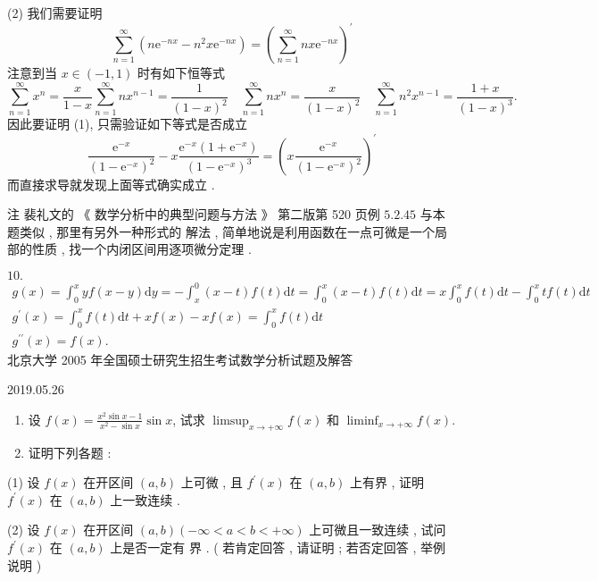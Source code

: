 \documentclass[10pt]{article}
\begin{document}
(2)  我们需要证明 
$$
\sum_{n=1}^{\infty}\left(n \mathrm{e}^{-n x}-n^{2} x \mathrm{e}^{-n x}\right)=\left(\sum_{n=1}^{\infty} n x \mathrm{e}^{-n x}\right)^{\prime}
$$
 注意到当  $x \in(-1,1)$  时有如下恒等式 
$$
\sum_{n=1}^{\infty} x^{n}=\frac{x}{1-x} \sum_{n=1}^{\infty} n x^{n-1}=\frac{1}{(1-x)^{2}} \quad \sum_{n=1}^{\infty} n x^{n}=\frac{x}{(1-x)^{2}} \quad \sum_{n=1}^{\infty} n^{2} x^{n-1}=\frac{1+x}{(1-x)^{3}} .
$$
 因此要证明  (1),  只需验证如下等式是否成立 
$$
\frac{\mathrm{e}^{-x}}{\left(1-\mathrm{e}^{-x}\right)^{2}}-x \frac{\mathrm{e}^{-x}\left(1+\mathrm{e}^{-x}\right)}{\left(1-\mathrm{e}^{-x}\right)^{3}}=\left(x \frac{\mathrm{e}^{-x}}{\left(1-\mathrm{e}^{-x}\right)^{2}}\right)^{\prime}
$$
 而直接求导就发现上面等式确实成立 .

 注   裴礼文的 《 数学分析中的典型问题与方法 》 第二版第  520  页例  $5.2 .45$  与本题类似 ,  那里有另外一种形式的   解法 ,  简单地说是利用函数在一点可微是一个局部的性质 ,  找一个内闭区间用逐项微分定理 .

$10 .$
$$
\begin{gathered}
g(x)=\int_{0}^{x} y f(x-y) \mathrm{d} y=-\int_{x}^{0}(x-t) f(t) \mathrm{d} t=\int_{0}^{x}(x-t) f(t) \mathrm{d} t=x \int_{0}^{x} f(t) \mathrm{d} t-\int_{0}^{x} t f(t) \mathrm{d} t \\
g^{\prime}(x)=\int_{0}^{x} f(t) \mathrm{d} t+x f(x)-x f(x)=\int_{0}^{x} f(t) \mathrm{d} t \\
g^{\prime \prime}(x)=f(x) .
\end{gathered}
$$
 北京大学  2005  年全国硕士研究生招生考试数学分析试题及解答 

   

2019.05.26

\begin{enumerate}
  \item  设  $f(x)=\frac{x^{2} \sin x-1}{x^{2}-\sin x} \sin x$,  试求  $\limsup _{x \rightarrow+\infty} f(x)$  和  $\liminf _{x \rightarrow+\infty} f(x)$.

  \item  证明下列各题 :

\end{enumerate}
(1)  设  $f(x)$  在开区间  $(a, b)$  上可微 ,  且  $f^{\prime}(x)$  在  $(a, b)$  上有界 ,  证明  $f^{\prime}(x)$  在  $(a, b)$  上一致连续 .

(2)  设  $f(x)$  在开区间  $(a, b)(-\infty<a<b<+\infty)$  上可微且一致连续 ,  试问  $f^{\prime}(x)$  在  $(a, b)$  上是否一定有   界 . ( 若肯定回答 ,  请证明 ;  若否定回答 ,  举例说明 )
\end{document}
